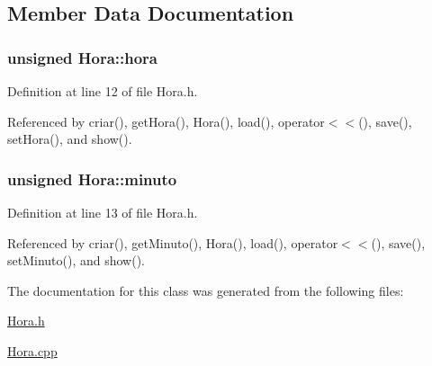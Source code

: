 \subsection{Member Data Documentation}
\hypertarget{class_hora_ab901e62ae1158965687dc736a45ee8fe}{
\subsubsection[{hora}]{\setlength{\rightskip}{0pt plus 5cm}unsigned Hora\+::hora\hspace{0.3cm}{\ttfamily [private]}}}\label{class_hora_ab901e62ae1158965687dc736a45ee8fe}


Definition at line 12 of file Hora.\+h.



Referenced by criar(), get\+Hora(), Hora(), load(), operator$<$$<$(), save(), set\+Hora(), and show().

\hypertarget{class_hora_a9d33ce2d8a3f4b3d05b2a3c6df782fa4}{
\subsubsection[{minuto}]{\setlength{\rightskip}{0pt plus 5cm}unsigned Hora\+::minuto\hspace{0.3cm}{\ttfamily [private]}}}\label{class_hora_a9d33ce2d8a3f4b3d05b2a3c6df782fa4}


Definition at line 13 of file Hora.\+h.



Referenced by criar(), get\+Minuto(), Hora(), load(), operator$<$$<$(), save(), set\+Minuto(), and show().



The documentation for this class was generated from the following files\+:\begin{DoxyCompactItemize}
\item 
\hyperlink{_hora_8h}{Hora.\+h}\item 
\hyperlink{_hora_8cpp}{Hora.\+cpp}\end{DoxyCompactItemize}
